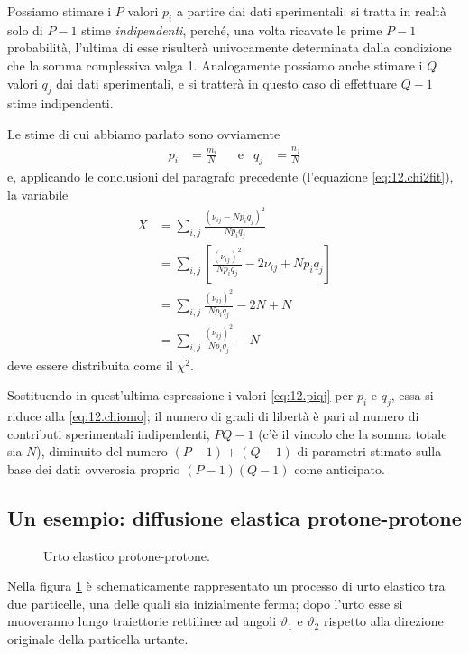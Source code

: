 Possiamo stimare i $P$ valori $p_i$ a partire dai dati
sperimentali: si tratta in realt\`a solo di $P-1$ stime
\emph{indipendenti}, perch\'e, una volta ricavate le prime
$P-1$ probabilit\`a, l'ultima di esse risulter\`a
univocamente determinata dalla condizione che la somma
complessiva valga 1.  Analogamente possiamo anche stimare i
$Q$ valori $q_j$ dai dati sperimentali, e si tratter\`a in
questo caso di effettuare $Q-1$ stime indipendenti.

Le stime di cui abbiamo parlato sono ovviamente
\begin{align} \label{eq:12.piqj}
  p_i &= \frac{m_i}{N} &&\text{e} & q_j &=
    \frac{n_j}{N}
\end{align}
e, applicando le conclusioni del paragrafo precedente
(l'equazione \eqref{eq:12.chi2fit}), la variabile
\begin{align*}
  X &= \sum_{i,j} \frac{\left( \nu_{ij} - N p_i q_j
    \right)^2}{N p_i q_j} \\[1ex]
  &= \sum_{i,j} \left[ \frac{\left( \nu_{ij}
    \right)^2}{N p_i q_j} - 2 \nu_{ij} + N p_i q_j
    \right] \\[1ex]
  &= \sum_{i,j} \frac{\left( \nu_{ij} \right)^2}{N p_i
    q_j} -2N + N \\[1ex]
  &= \sum_{i,j} \frac{\left( \nu_{ij} \right)^2}{N p_i
    q_j} - N
\end{align*}
deve essere distribuita come il $\chi^2$.

Sostituendo in quest'ultima espressione i valori
\eqref{eq:12.piqj} per $p_i$ e $q_j$, essa si riduce alla
\eqref{eq:12.chiomo}; il numero di gradi di libert\`a \`e
pari al numero di contributi sperimentali indipendenti, $PQ
- 1$ (c'\`e il vincolo che la somma totale sia $N$),
diminuito del numero $(P-1) + (Q-1)$ di parametri stimato
sulla base dei dati: ovverosia proprio $(P-1) (Q-1)$ come
anticipato.%

\subsection{Un esempio: diffusione elastica protone-protone}
\begin{figure}[hbtp]
  \vspace*{2ex}
  \begin{center} {
    
  } \end{center}
  \caption{Urto elastico protone-protone.}
  \label{fig:12.scat}
\end{figure}
Nella figura \ref{fig:12.scat} \`e schematicamente
rappresentato un processo di urto elastico tra due
particelle, una delle quali sia inizialmente ferma; dopo
l'urto esse si muoveranno lungo traiettorie rettilinee ad
angoli $\vartheta_1$ e $\vartheta_2$ rispetto alla direzione
originale della particella urtante.

